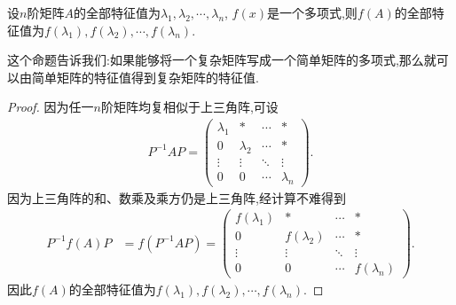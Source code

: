\documentclass[../../main.tex]{subfiles}
\begin{document}
\begin{proposition}\label{proposition:矩阵多项式的特征值就是原特征值代入多项式得到的数}
设$n$阶矩阵$A$的全部特征值为$\lambda_1, \lambda_2, \cdots, \lambda_n$, $f(x)$是一个多项式,则$f(A)$的全部特征值为$f(\lambda_1), f(\lambda_2), \cdots, f(\lambda_n)$.
\end{proposition}
\begin{remark}
这个命题告诉我们:如果能够将一个复杂矩阵写成一个简单矩阵的多项式,那么就可以由简单矩阵的特征值得到复杂矩阵的特征值.
\end{remark}
\begin{proof}
因为任一$n$阶矩阵均复相似于上三角阵,可设
\begin{align*}
P^{-1}AP = \begin{pmatrix}
\lambda_1 & * & \cdots & * \\
0 & \lambda_2 & \cdots & * \\
\vdots & \vdots & \ddots & \vdots \\
0 & 0 & \cdots & \lambda_n
\end{pmatrix}.
\end{align*}
因为上三角阵的和、数乘及乘方仍是上三角阵,经计算不难得到
\begin{align*}
P^{-1}f(A)P &= f(P^{-1}AP) = \begin{pmatrix}
f(\lambda_1) & * & \cdots & * \\
0 & f(\lambda_2) & \cdots & * \\
\vdots & \vdots & \ddots & \vdots \\
0 & 0 & \cdots & f(\lambda_n)
\end{pmatrix}.
\end{align*}
因此$f(A)$的全部特征值为$f(\lambda_1), f(\lambda_2), \cdots, f(\lambda_n)$.
\end{proof}
\end{document}
